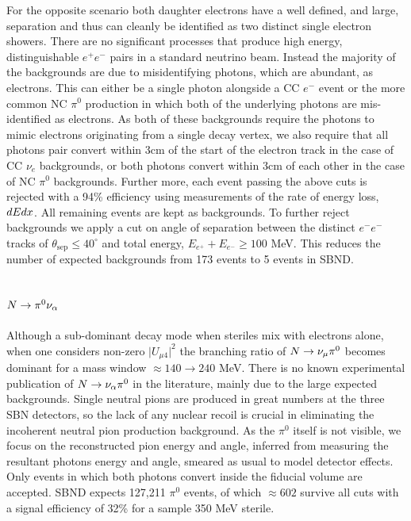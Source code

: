 \documentclass[11pt, a4paper]{article}
\def\ster{\ensuremath N}
\begin{document}
For the opposite scenario both daughter electrons have a well defined, and
large, separation and thus can cleanly be identified as two distinct single
electron showers. There are no significant processes that produce high energy,
distinguishable $e^+e^-$ pairs in a standard neutrino beam.  Instead the
majority of the backgrounds are due to misidentifying photons, which are
abundant, as electrons. This can either be a single photon alongside a CC $e^-$
event or the more common NC $\pi^0$ production in which both of the underlying
photons are mis-identified as electrons. As both of these backgrounds require
the photons to mimic electrons originating from a single decay vertex, we also
require that all photons pair convert within 3cm of the start of the electron
track in the case of CC $\nu_e$ backgrounds, or both photons convert within 3cm
of each other in the case of NC $\pi^0$ backgrounds. Further more, each event
passing the above cuts is rejected with a 94\% efficiency using measurements of
the rate of energy loss, $dE\/dx$. All remaining events are kept as
backgrounds. To further reject backgrounds we apply a cut on angle of
separation between the distinct $e^-e^-$ tracks of $\theta_\text{sep}\leq 40
^\circ$ and total energy, $E_{e^+}+E_{e^-} \geq 100$ MeV. This reduces the
number of expected backgrounds from 173 events to 5 events in SBND. 

\subsection{$\ster\rightarrow \pi^0 \nu_\alpha$}

Although a sub-dominant decay mode when steriles mix with electrons alone, when
one considers non-zero $\vert U_{\mu4}\vert^2$ the branching ratio of $\ster
\rightarrow \nu_\mu \pi^0$ becomes dominant for a mass window $\approx 140
\rightarrow 240$ MeV. There is no known experimental publication of $\ster
\rightarrow \nu_\alpha \pi^0$ in the literature, mainly due to the large
expected backgrounds. Single neutral pions are produced in great numbers at the
three SBN detectors, so the lack of any nuclear recoil is crucial in
eliminating the incoherent neutral pion production background. As the $\pi^0$
itself is not visible, we focus on the reconstructed pion energy and angle,
inferred from measuring the resultant photons energy and angle, smeared as
usual to model detector effects. Only events in which both photons convert
inside the fiducial volume are accepted. SBND expects 127,211 $\pi^0$ events,
of which $\approx 602$ survive all cuts with a signal efficiency of 32\% for a
sample 350 MeV sterile. \\ 
\end{document}
